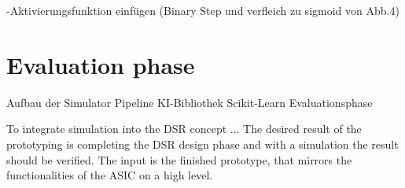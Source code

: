 -Aktivierungsfunktion einfügen (Binary Step und verfleich zu sigmoid von Abb.4)



\section{Evaluation phase}

Aufbau der Simulator Pipeline
KI-Bibliothek Scikit-Learn
Evaluationsphase

To integrate simulation into the DSR concept ... 
The desired result of the prototyping is completing the \ac{DSR} design phase and with a simulation the result should be verified.
The input is the finished prototype, that mirrors the functionalities of the \ac{ASIC} on a high level.

